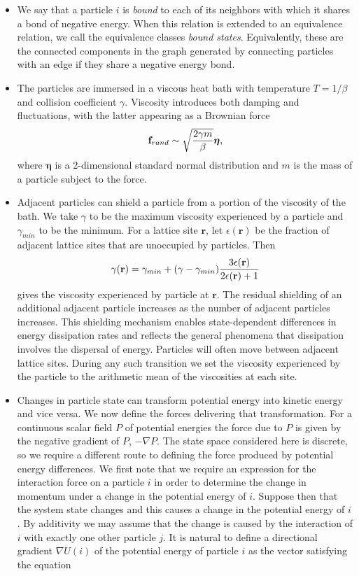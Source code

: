 \documentclass[12pt,letterpaper]{article}
\newcommand{\mb}{\mathbf}
\begin{document}
\begin{itemize}
\begin{align*}
U(i) = \sum_{j}U_{ij}.
\end{align*}
\item We say that a particle $i$ is {\em bound} to each of its neighbors with which it shares a bond of negative energy. When this relation is extended to an equivalence relation, we call the equivalence classes {\em bound states}. Equivalently, these are the connected components in the graph generated by connecting particles with an edge if they share a negative energy bond.
\item The particles are immersed in a viscous heat bath with temperature $T = 1/\beta$ and collision coefficient $\gamma$. Viscosity introduces both damping and fluctuations, with the latter appearing as a Brownian force
\begin{align*}
\mb{f}_{rand} \sim \sqrt{2\gamma m \over \beta}\boldsymbol{\eta},
\end{align*}
where $\boldsymbol{\eta}$ is a 2-dimensional standard normal distribution and $m$ is the mass of a particle subject to the force.
\item Adjacent particles can shield a particle from a portion of the viscosity of the bath. We take $\gamma$ to be the maximum viscosity experienced by a particle and $\gamma_{min}$ to be the minimum. For a lattice site $\mb{r}$, let $\epsilon(\mb{r})$ be the fraction of adjacent lattice sites that are unoccupied by particles. Then
\begin{align*}
\gamma(\mb{r}) = \gamma_{min} + (\gamma - \gamma_{min}){3\epsilon(\mb{r}) \over 2\epsilon(\mb{r}) + 1}
\end{align*}
gives the viscosity experienced by particle at $\mb{r}$. The residual shielding of an additional adjacent particle increases as the number of adjacent particles increases. This shielding mechanism enables state-dependent differences in energy dissipation rates and reflects the general phenomena that dissipation involves the dispersal of energy. Particles will often move between adjacent lattice sites. During any such transition we set the viscosity experienced by the particle to the arithmetic mean of the viscosities at each site.
\item Changes in particle state can transform potential energy into kinetic energy and vice versa. We now define the forces delivering that transformation. For a continuous scalar field $P$ of potential energies the force due to $P$ is given by the negative gradient of $P$, $-\nabla P$. The state space considered here is discrete, so we require a different route to defining the force produced by potential energy differences. We first note that we require an expression for the interaction force on a particle $i$ in order to determine the change in momentum under a change in the potential energy of $i$. Suppose then that the system state changes and this causes a change in the potential energy of $i$. By additivity we may assume that the change is caused by the interaction of $i$ with exactly one other particle $j$. It is natural to define a directional gradient $\nabla U(i)$ of the potential energy of particle $i$ as the vector satisfying the equation

\end{itemize}
\end{document}

